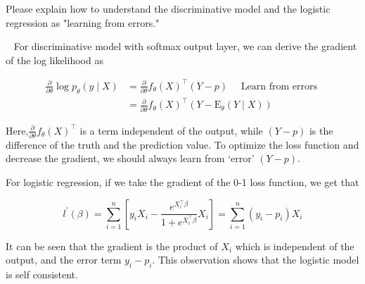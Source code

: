 \begin{exercise}[]{Please explain how to understand the discriminative model and the logistic regression as "learning from errors."}
  \begin{solution}
  \par{~}
    For discriminative model with softmax output layer, we can derive the gradient of the log likelihood as

  \begin{equation}
    \begin{aligned}
    \frac{\partial}{\partial \theta} \log p_{\theta}(y \mid X) &=\frac{\partial}{\partial \theta} f_{\theta}(X)^{\top}(Y-p) \quad \text { Learn from errors } \\
    &=\frac{\partial}{\partial \theta} f_{\theta}(X)^{\top}\left(Y-\mathrm{E}_{\theta}(Y \mid X)\right)
    \end{aligned}
  \end{equation}

  Here,$\frac{\partial}{\partial \theta}f_{\theta}(X)^{\top}$ is a term independent of the output, while $(Y - p)$ is the difference of the truth and the prediction value. To optimize the loss function and decrease the gradient, we should always learn from `error'  $(Y - p)$.

  For logistic regression, if we take the gradient of the 0-1 loss function, we get that

  \begin{equation}
    l^{\prime}(\beta)=\sum_{i=1}^{n}\left[y_{i} X_{i}-\frac{e^{X_{i}^{\top} \beta}}{1+e^{X_{i}^{\top} \beta}} X_{i}\right]=\sum_{i=1}^{n}\left(y_{i}-p_{i}\right) X_{i}
  \end{equation}

  It can be seen that the gradient is the product of $X_i$ which is independent of the output, and the error term $y_i - p_i$. This observation shows that the logistic model is self consistent.
  \end{solution}
  \label{ex2}
\end{exercise}

